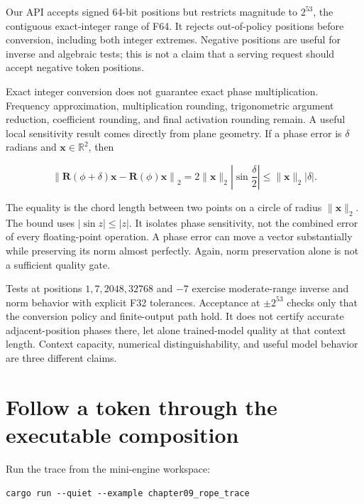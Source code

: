 Our API accepts signed 64-bit positions but restricts magnitude to
\(2^{53}\), the contiguous exact-integer range of F64. It rejects
out-of-policy positions before conversion, including both integer
extremes. Negative positions are useful for inverse and algebraic tests;
this is not a claim that a serving request should accept negative token
positions.

Exact integer conversion does not guarantee exact phase multiplication.
Frequency approximation, multiplication rounding, trigonometric argument
reduction, coefficient rounding, and final activation rounding remain. A
useful local sensitivity result comes directly from plane geometry. If a
phase error is \(\delta\) radians and \(\mathbf{x}\in\mathbb{R}^2\),
then

\begin{equation}
\left\|\mathbf{R}(\phi+\delta)\mathbf{x}
      -\mathbf{R}(\phi)\mathbf{x}\right\|_2
=2\|\mathbf{x}\|_2\left|\sin\frac{\delta}{2}\right|
\le\|\mathbf{x}\|_2|\delta|.
\end{equation}

The equality is the chord length between two points on a circle of
radius \(\|\mathbf{x}\|_2\). The bound uses \(|\sin z|\le|z|\). It
isolates phase sensitivity, not the combined error of every
floating-point operation. A phase error can move a vector substantially
while preserving its norm almost perfectly. Again, norm preservation
alone is not a sufficient quality gate.

Tests at positions \(1,7,2048,32768\) and \(-7\) exercise moderate-range
inverse and norm behavior with explicit F32 tolerances. Acceptance at
\(\pm2^{53}\) checks only that the conversion policy and finite-output
path hold. It does not certify accurate adjacent-position phases there,
let alone trained-model quality at that context length. Context
capacity, numerical distinguishability, and useful model behavior are
three different claims.

\section{Follow a token through the executable
composition}\label{follow-a-token-through-the-executable-composition}

Run the trace from the mini-engine workspace:

\begin{verbatim}
cargo run --quiet --example chapter09_rope_trace
\end{verbatim}

